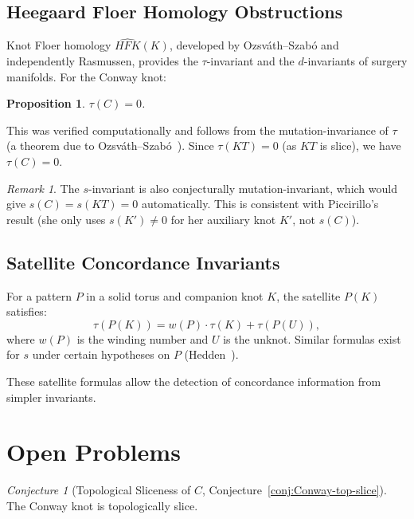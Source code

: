 \documentclass[12pt,a4paper]{amsart}
\newtheorem{proposition}[theorem]{Proposition}
\theoremstyle{definition}
\theoremstyle{remark}
\newtheorem{remark}[theorem]{Remark}
\newtheorem{conjecture}[theorem]{Conjecture}
\begin{document}
\subsection{Heegaard Floer Homology Obstructions}

Knot Floer homology $\widehat{HFK}(K)$, developed by Ozsváth--Szabó
and independently Rasmussen, provides the $\tau$-invariant and the
$d$-invariants of surgery manifolds. For the Conway knot:

\begin{proposition}
$\tau(C) = 0$.
\end{proposition}

This was verified computationally and follows from the mutation-invariance
of $\tau$ (a theorem due to Ozsváth--Szabó~\cite{OzsvathSzabo2004}).
Since $\tau(KT) = 0$ (as $KT$ is slice), we have $\tau(C) = 0$.

\begin{remark}
The $s$-invariant is also conjecturally mutation-invariant, which would
give $s(C) = s(KT) = 0$ automatically. This is consistent with Piccirillo's
result (she only uses $s(K') \neq 0$ for her auxiliary knot $K'$, not $s(C)$).
\end{remark}

\subsection{Satellite Concordance Invariants}

For a pattern $P$ in a solid torus and companion knot $K$, the satellite
$P(K)$ satisfies:
\[
    \tau(P(K)) = w(P) \cdot \tau(K) + \tau(P(U)),
\]
where $w(P)$ is the winding number and $U$ is the unknot. Similar formulas
exist for $s$ under certain hypotheses on $P$ (Hedden~\cite{Hedden2009}).

These satellite formulas allow the detection of concordance information
from simpler invariants.

\section{Open Problems}

\begin{conjecture}[Topological Sliceness of $C$, Conjecture~\ref{conj:Conway-top-slice}]
The Conway knot is topologically slice.
\end{conjecture}
\end{document}
